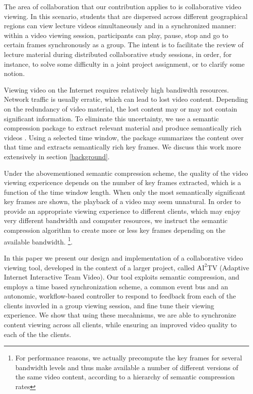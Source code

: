 \documentclass{sig-alternate}
\begin{document}
The area of collaboration that our contribution applies to is
collaborative video viewing.  In this scenario, students that are
dispersed across different geographical regions can view lecture
videos simultaneously and in a synchronized manner: within a video viewing session, 
participants can play, pause, stop and go to certain frames synchronously as a group.
The intent is to facilitate the review of lecture material during distributed 
collaborative study sessions, in order, for instance, to solve some difficulty in a joint 
project assignment, or to clarify some notion.

Viewing video on the Internet requires relatively high bandiwdth
resources.  Network traffic is usually erratic, which can lead to lost
video content. Depending on the redundancy of video material, the lost content may or may not
contain significant information. 
To eliminate this uncertainty,
we use a semantic compression package \cite{TIECHENG} to extract 
relevant material and produce semantically rich videos .  
Using a selected time window, the package
summarizes the content over that time and extracts semantically rich
key frames.  We discuss this work more extensively in section
\ref{background}.

Under the abovementioned semantic compression scheme, the quality of
the video viewing expericence depends on the number of key frames
extracted, which is a function of the time window length. When only
the most semantically significant key frames are shown, the playback
of a video may seem unnatural.  In order to provide an appropriate
viewing experience to different clients, which may enjoy very
different bandwidth and computer resources, we instruct the semantic
compression algorithm to create more or less key frames depending on
the available bandwidth. \footnote{For performance reasons, we
actually precompute the key frames for several bandwidth levels and
thus make available a number of different versions of the same video
content, according to a hierarchy of semantic compression rates}.

In this paper we present our design and implementation of a
collaborative video viewing tool, developed in the context of a larger
project, called $\mathrm{AI}^2$TV (Adaptive Internet Interactive Team
Video).  Our tool exploits semantic compression, and employs a time
based synchronization scheme, a common event bus and an autonomic,
workflow-based controller to respond to feedback from each of the
clients invovled in a group viewing session, and fine tune their
viewing experience.  We show that using these mecahnisms, we are able
to synchronize content viewing across all clients, while ensuring an
improved video quality to each of the the clients.
\end{document}

